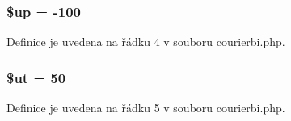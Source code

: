 \hypertarget{courierbi_8php_a6b5ad2ac55f9df46e8f34e78fbd6f176}{
\subsubsection[{\$up}]{\setlength{\rightskip}{0pt plus 5cm}\$up = -\/100}}\label{courierbi_8php_a6b5ad2ac55f9df46e8f34e78fbd6f176}


Definice je uvedena na řádku 4 v souboru courierbi.\-php.

\hypertarget{courierbi_8php_aadd3f841051043ee58e587e840e8dd0b}{
\subsubsection[{\$ut}]{\setlength{\rightskip}{0pt plus 5cm}\$ut = 50}}\label{courierbi_8php_aadd3f841051043ee58e587e840e8dd0b}


Definice je uvedena na řádku 5 v souboru courierbi.\-php.

